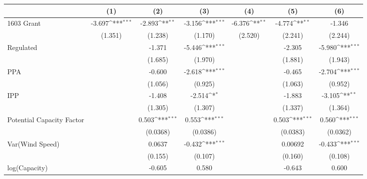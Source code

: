 {
\def\sym#1{\ifmmode^{#1}\else\(^{#1}\)\fi}
\begin{tabular}{l*{6}{c}}
\toprule
                &\multicolumn{1}{c}{(1)}         &\multicolumn{1}{c}{(2)}         &\multicolumn{1}{c}{(3)}         &\multicolumn{1}{c}{(4)}         &\multicolumn{1}{c}{(5)}         &\multicolumn{1}{c}{(6)}         \\
\midrule
1603 Grant      &   -3.697\sym{***}&   -2.893\sym{**} &   -3.156\sym{***}&   -6.376\sym{**} &   -4.774\sym{**} &   -1.346         \\
                &  (1.351)         &  (1.238)         &  (1.170)         &  (2.520)         &  (2.241)         &  (2.244)         \\
\addlinespace
Regulated       &                  &   -1.371         &   -5.446\sym{***}&                  &   -2.305         &   -5.980\sym{***}\\
                &                  &  (1.685)         &  (1.970)         &                  &  (1.881)         &  (1.943)         \\
\addlinespace
PPA             &                  &   -0.600         &   -2.618\sym{***}&                  &   -0.465         &   -2.704\sym{***}\\
                &                  &  (1.056)         &  (0.925)         &                  &  (1.063)         &  (0.952)         \\
\addlinespace
IPP             &                  &   -1.408         &   -2.514\sym{*}  &                  &   -1.883         &   -3.105\sym{**} \\
                &                  &  (1.305)         &  (1.307)         &                  &  (1.337)         &  (1.364)         \\
\addlinespace
Potential Capacity Factor&                  &    0.503\sym{***}&    0.553\sym{***}&                  &    0.503\sym{***}&    0.560\sym{***}\\
                &                  & (0.0368)         & (0.0386)         &                  & (0.0383)         & (0.0362)         \\
\addlinespace
Var(Wind Speed) &                  &   0.0637         &   -0.432\sym{***}&                  &  0.00692         &   -0.433\sym{***}\\
                &                  &  (0.155)         &  (0.107)         &                  &  (0.160)         &  (0.108)         \\
\addlinespace
log(Capacity)   &                  &   -0.605         &    0.580         &                  &   -0.643         &    0.600         \\

\end{tabular}}

